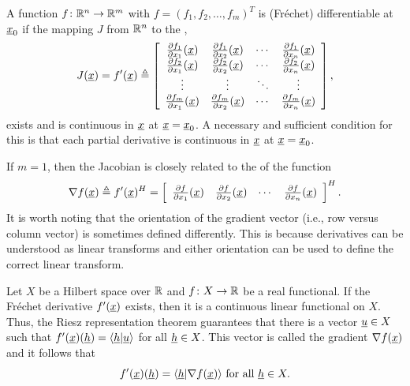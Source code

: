 \begin{example}
A function $f\colon \mathbb{R}^n \to \mathbb{R}^m$ with $f = (f_1,f_2,\ldots,f_m)^T$ is (Fr\'{e}chet) differentiable at $\underline{x}_0$ if the mapping $J$ from $\mathbb{R}^n$ to the ,
\[ J(\underline{x})=f'(\underline{x}) \triangleq \left[ \begin{array}{cccc} \frac{\partial  f_1}{\partial  x_1} (\underline{x}) & \frac{\partial  f_1}{\partial  x_2} (\underline{x}) & \cdots & \frac{\partial  f_1}{\partial  x_n} (\underline{x}) \\
\frac{\partial  f_2}{\partial  x_1} (\underline{x}) & \frac{\partial  f_2}{\partial  x_2} (\underline{x}) & \cdots & \frac{\partial  f_2}{\partial  x_n} (\underline{x}) \\
\vdots & \vdots & \ddots & \vdots \\
\frac{\partial  f_m}{\partial  x_1} (\underline{x}) & \frac{\partial  f_m}{\partial  x_2} (\underline{x}) & \cdots & \frac{\partial  f_m}{\partial  x_n} (\underline{x}) \end{array} \right], \]
exists and is continuous in $\underline{x}$ at $\underline{x}=\underline{x}_0$.
A necessary and sufficient condition for this is that each partial derivative is continuous in $\underline{x}$ at $\underline{x}=\underline{x}_0$.

If $m=1$, then the Jacobian is closely related to the  of the function
\[ \nabla f(\underline{x}) \triangleq f'(\underline{x})^H =  \left[ \begin{array}{cccc} \frac{\partial  f}{\partial  x_1} (\underline{x}) & \frac{\partial  f}{\partial  x_2} (\underline{x}) & \cdots & \frac{\partial  f}{\partial  x_n} (\underline{x}) \end{array} \right]^H . \]
It is worth noting that the orientation of the gradient vector (i.e., row versus column vector) is sometimes defined differently.
This is because derivatives can be understood as linear transforms and either orientation can be used to define the correct linear transform. 
\end{example}

\begin{example}
Let $X$ be a Hilbert space over $\mathbb{R}$ and $f\colon X \to \mathbb{R}$ be a real functional.
If the Fr\'{e}chet derivative $f'(\underline{x})$ exists, then it is a continuous linear functional on $X$.
Thus, the Riesz representation theorem guarantees that there is a vector $\underline{u} \in X$ such that
$ f'(\underline{x})(\underline{h}) = \langle\underline{h} | \underline{u} \rangle $ for all $\underline{h}\in X$.
This vector is called the gradient $\nabla f(\underline{x})$ and it follows that
$$ f'(\underline{x})(\underline{h}) = \langle\underline{h} | \nabla f (\underline{x}) \rangle \text{ for all } \underline{h}\in X. $$
\end{example}

